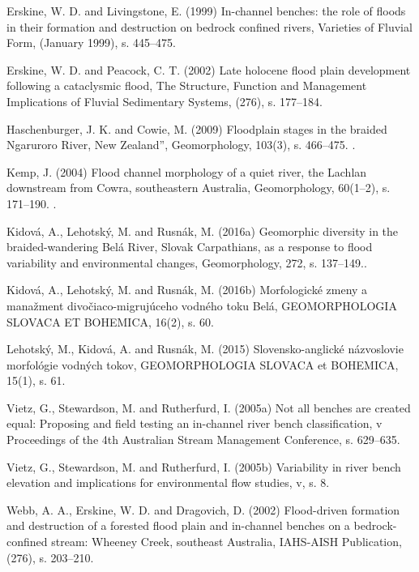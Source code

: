 {Erskine, W. D. and Livingstone, E. (1999) In-channel benches: the role of floods in their formation and destruction on bedrock confined rivers, Varieties of Fluvial Form, (January 1999), s. 445–475.
	
Erskine, W. D. and Peacock, C. T. (2002) Late holocene flood plain development following a cataclysmic flood, The Structure, Function and Management Implications of Fluvial Sedimentary Systems, (276), s. 177–184.
	
Haschenburger, J. K. and Cowie, M. (2009) Floodplain stages in the braided Ngaruroro River, New Zealand”, Geomorphology, 103(3), s. 466–475. .
	
Kemp, J. (2004) Flood channel morphology of a quiet river, the Lachlan downstream from Cowra, southeastern Australia, Geomorphology, 60(1–2), s. 171–190. .
	
Kidová, A., Lehotský, M. and Rusnák, M. (2016a) Geomorphic diversity in the braided-wandering Belá River, Slovak Carpathians, as a response to flood variability and environmental changes, Geomorphology, 272, s. 137–149..
	
Kidová, A., Lehotský, M. and Rusnák, M. (2016b) Morfologické zmeny a manažment divočiaco-migrujúceho vodného toku Belá, GEOMORPHOLOGIA SLOVACA ET BOHEMICA, 16(2), s. 60.
	
Lehotský, M., Kidová, A. and Rusnák, M. (2015) Slovensko-anglické názvoslovie morfológie vodných tokov, GEOMORPHOLOGIA SLOVACA et BOHEMICA, 15(1), s. 61.
	
Vietz, G., Stewardson, M. and Rutherfurd, I. (2005a) Not all benches are created equal: Proposing and field testing an in-channel river bench classification, v Proceedings of the 4th Australian Stream Management Conference, s. 629–635.
	
Vietz, G., Stewardson, M. and Rutherfurd, I. (2005b) Variability in river bench elevation and implications for environmental flow studies, v, s. 8.
	
Webb, A. A., Erskine, W. D. and Dragovich, D. (2002) Flood-driven formation and destruction of a forested flood plain and in-channel benches on a bedrock-confined stream: Wheeney Creek, southeast Australia, IAHS-AISH Publication, (276), s. 203–210.
}%

